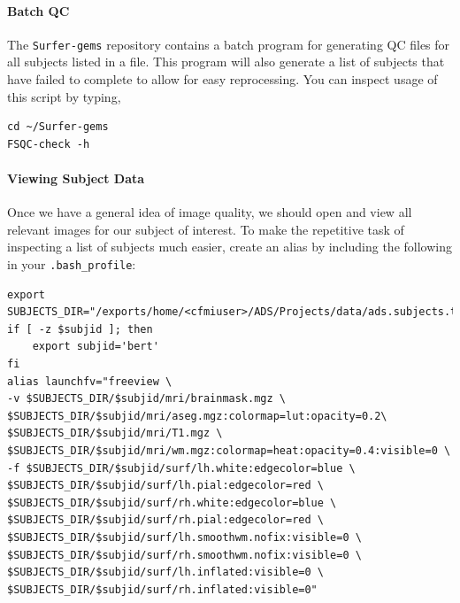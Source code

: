\documentclass[paper=a4, fontsize=11pt]{scrartcl} %
\numberwithin{equation}{section} %
\numberwithin{figure}{section} %
\numberwithin{table}{section} %
\begin{document}
\paragraph{Batch QC}  The \texttt{Surfer-gems} repository contains a batch program for generating QC files for all subjects listed in a file.  This program will also generate a list of subjects that have failed to complete to allow for easy reprocessing.  You can inspect usage of this script by typing,

\begin{lstlisting}
cd ~/Surfer-gems
FSQC-check -h
\end{lstlisting}

\paragraph{Viewing Subject Data} Once we have a general idea of image quality, we should open and view all relevant images for our subject of interest. To make the repetitive task of inspecting a list of subjects much easier, create an alias by including the following in your \texttt{.bash\_profile}:
\newpage
\begin{lstlisting}
export SUBJECTS_DIR="/exports/home/<cfmiuser>/ADS/Projects/data/ads.subjects.tutorial"
if [ -z $subjid ]; then
	export subjid='bert'
fi
alias launchfv="freeview \
-v $SUBJECTS_DIR/$subjid/mri/brainmask.mgz \                                                                               
$SUBJECTS_DIR/$subjid/mri/aseg.mgz:colormap=lut:opacity=0.2\                                                                                        
$SUBJECTS_DIR/$subjid/mri/T1.mgz \                                                                                                                  
$SUBJECTS_DIR/$subjid/mri/wm.mgz:colormap=heat:opacity=0.4:visible=0 \                                                                              
-f $SUBJECTS_DIR/$subjid/surf/lh.white:edgecolor=blue \                                                                                             
$SUBJECTS_DIR/$subjid/surf/lh.pial:edgecolor=red \                                                                                                  
$SUBJECTS_DIR/$subjid/surf/rh.white:edgecolor=blue \                                                                                                
$SUBJECTS_DIR/$subjid/surf/rh.pial:edgecolor=red \                                                                                                  
$SUBJECTS_DIR/$subjid/surf/lh.smoothwm.nofix:visible=0 \                                                                                            
$SUBJECTS_DIR/$subjid/surf/rh.smoothwm.nofix:visible=0 \                                                                                            
$SUBJECTS_DIR/$subjid/surf/lh.inflated:visible=0 \                                                                                                  
$SUBJECTS_DIR/$subjid/surf/rh.inflated:visible=0"
\end{lstlisting}
\end{document}
